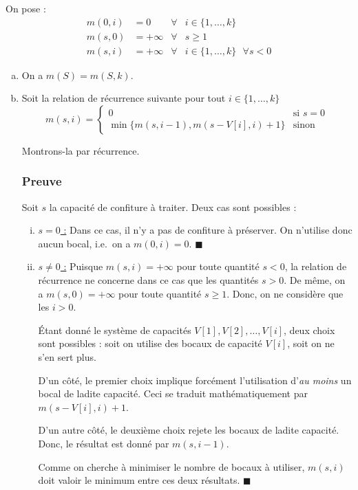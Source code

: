 \documentclass[12pt,a4paper]{article}
\begin{document}
On pose :
\begin{align*}
 m(0,i) &= 0 & \forall & i \in \{1,\dotsc, k\} \\
 m(s,0) &= +\infty & \forall & s \geq 1 \\
 m(s,i) &= + \infty & \forall & i \in \{1,\dotsc,k\} \text{ }\forall s < 0
\end{align*}

\begin{enumerate}[a)]
\item On a \( m(S) = m(S,k)\).

\item Soit la relation de r\'ecurrence suivante pour tout $ i \in \{1,\dotsc,k\} $
\[
m(s,i) = 
\begin{cases}
0 & \text{si } s = 0 \\
\min \{m(s,i-1),m(s-V[i],i)+1\} & \text{sinon}
\end{cases}
\]

Montrons-la par r\'ecurrence.

\subsubsection*{Preuve}
Soit $s$ la capacit\'e de confiture \`a traiter. Deux cas sont possibles :
\begin{enumerate}[i)]
 \item \underline{$s = 0$ :} Dans ce cas, il n'y a pas de confiture \`a pr\'eserver. On n'utilise donc aucun bocal, i.e.\ on a $m(0,i) = 0$. \hfill\ensuremath{\blacksquare}
 \item \underline{$s \neq 0$ :} Puisque $m(s,i) = +\infty$ pour toute quantit\'e $s < 0$, la relation de r\'ecurrence ne concerne dans ce cas que les quantit\'es $s > 0$. De m\^eme, on a $m(s,0) = +\infty$ pour toute quantit\'e $s \geq 1$. Donc, on ne consid\`ere que les $i > 0$.
 
\'Etant donn\'e le syst\`eme de capacit\'es $V[1], V[2], \dotsc, V[i]$, deux choix sont possibles : soit on utilise des bocaux de capacit\'e $V[i]$, soit on ne s'en sert plus. 

D'un c\^ot\'e, le premier choix implique forc\'ement l'utilisation d'{\itshape au moins} un bocal de ladite capacit\'e. Ceci se traduit math\'ematiquement par $m(s-V[i],i)+1$. 

D'un autre c\^ot\'e, le deuxi\`eme choix rejete les bocaux de ladite capacit\'e. Donc, le r\'esultat est donn\'e par $m(s,i-1)$.

Comme on cherche \`a minimiser le nombre de bocaux \`a utiliser, $m(s,i)$ doit valoir le minimum entre ces deux r\'esultats. \hfill\ensuremath{\blacksquare}
\end{enumerate}
\end{enumerate}
\end{document}
